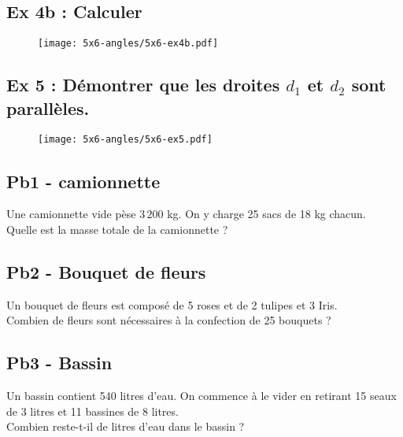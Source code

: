 \Pointilles[6]
\newpage

\begin{multicols}{2}
\subsection*{Ex 4b : Calculer}

\Pointilles[8] \columnbreak

\begin{figure}[H]
  \centering
  \texttt{[image: 5x6-angles/5x6-ex4b.pdf]}
\end{figure} 

\end{multicols}

\begin{multicols}{2}
\subsection*{Ex 5 : Démontrer que les droites $d_1$ et $d_2$ sont parallèles.}

\Pointilles[8] \columnbreak

\begin{figure}[H]
  \centering
  \texttt{[image: 5x6-angles/5x6-ex5.pdf]}
\end{figure} 

\end{multicols}

\subsection*{Pb1 - camionnette}

Une camionnette vide pèse $3\,200$ kg. On y charge 25 sacs de 18 kg chacun. \\
Quelle est la masse totale de la camionnette ?

\Pointilles[4]

\subsection*{Pb2 - Bouquet de fleurs}

Un bouquet de fleurs est composé de 5 roses et de 2 tulipes et 3 Iris. \\
Combien de fleurs sont nécessaires à la confection de 25 bouquets ?

\Pointilles[4]

\subsection*{Pb3 - Bassin}

Un bassin contient 540 litres d’eau. On commence à le vider en retirant 15 seaux de 3 litres et 11 bassines de 8 litres. \\
Combien reste-t-il de litres d’eau dans le bassin ?

\Pointilles[4]

